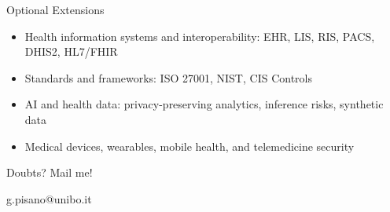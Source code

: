 \documentclass[presentation]{beamer}
\begin{document}
\begin{frame}[c]{Optional Extensions}
\begin{itemize}
    \item Health information systems and interoperability: EHR, LIS, RIS, PACS, DHIS2, HL7/FHIR
    \item Standards and frameworks: ISO 27001, NIST, CIS Controls
    \item AI and health data: privacy-preserving analytics, inference risks, synthetic data
    \item Medical devices, wearables, mobile health, and telemedicine security
\end{itemize}
\end{frame}

\begin{frame}[c,allowframebreaks]{Doubts? Mail me!}
\begin{center}
\Large g.pisano@unibo.it
\end{center}
\end{frame}

\begin{frame}[allowframebreaks]
\titlepage
\end{frame}

\section*{\refname}

\begin{frame}{\refname}
	\scriptsize
	
	
\end{frame}
\end{document}
